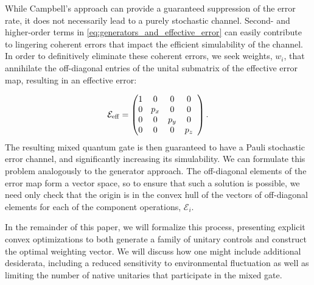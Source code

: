 \documentclass[aps,nofootinbib,pra,notitlepage,twocolumn]{revtex4-1}
\begin{document}
While Campbell's approach can provide a guaranteed suppression of the error rate, it does not necessarily lead to a purely stochastic channel. Second- and higher-order terms in \eqref{eq:generators_and_effective_error} can easily contribute to lingering coherent errors that impact the efficient simulability of the channel. In order to definitively eliminate these coherent errors, we seek weights, $w_i$, that annihilate the off-diagonal entries of the unital submatrix of the effective error map, resulting in an effective error:

\begin{equation}
	\mathcal{E}_{\rm{eff}} = 
	\left(\begin{array}{@{}ccccc@{}}
		1 & 0 & 0 & 0 \\ 
    	0 &  p_x & 0 & 0 \\
		0 & 0 &  p_y & 0\\
		0 & 0 & 0 &  p_z\\
	\end{array} 	
	\right).
\end{equation}
The resulting mixed quantum gate is then guaranteed to have a Pauli stochastic error channel, and significantly increasing its simulability. We can formulate this problem analogously to the generator approach. The off-diagonal elements of the error map form a vector space, so to ensure that such a solution is possible, we need only check that the origin is in the convex hull of the vectors of off-diagonal elements for each of the component operations, $\mathcal{E}_i$. 

In the remainder of this paper, we will formalize this process, presenting explicit convex optimizations to both generate a family of unitary controls and construct the optimal weighting vector. We will discuss how one might include additional desiderata, including a reduced sensitivity to environmental fluctuation as well as limiting the number of native unitaries that participate in the mixed gate. 
\end{document}
